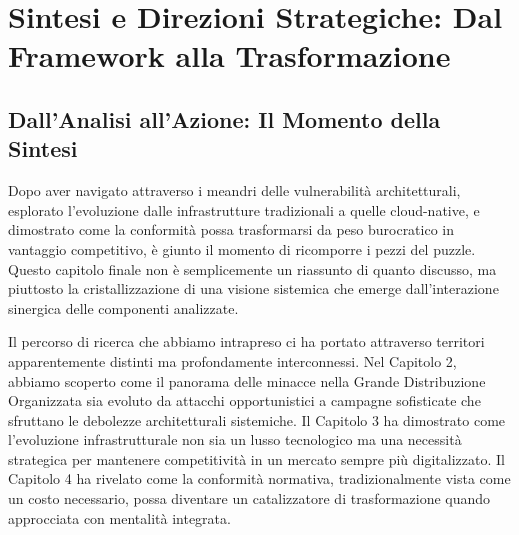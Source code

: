 


% 

% 

\chapter{Sintesi e Direzioni Strategiche: Dal Framework alla Trasformazione}
\label{cap5_synthesis}

\section{Dall'Analisi all'Azione: Il Momento della Sintesi}

Dopo aver navigato attraverso i meandri delle vulnerabilità architetturali, esplorato l'evoluzione dalle infrastrutture tradizionali a quelle cloud-native, e dimostrato come la conformità possa trasformarsi da peso burocratico in vantaggio competitivo, è giunto il momento di ricomporre i pezzi del puzzle. Questo capitolo finale non è semplicemente un riassunto di quanto discusso, ma piuttosto la cristallizzazione di una visione sistemica che emerge dall'interazione sinergica delle componenti analizzate.

Il percorso di ricerca che abbiamo intrapreso ci ha portato attraverso territori apparentemente distinti ma profondamente interconnessi. Nel Capitolo 2, abbiamo scoperto come il panorama delle minacce nella Grande Distribuzione Organizzata sia evoluto da attacchi opportunistici a campagne sofisticate che sfruttano le debolezze architetturali sistemiche. Il Capitolo 3 ha dimostrato come l'evoluzione infrastrutturale non sia un lusso tecnologico ma una necessità strategica per mantenere competitività in un mercato sempre più digitalizzato. Il Capitolo 4 ha rivelato come la conformità normativa, tradizionalmente vista come un costo necessario, possa diventare un catalizzatore di trasformazione quando approcciata con mentalità integrata.

